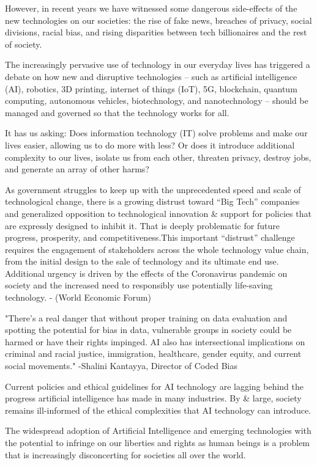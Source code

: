 \documentclass[11pt]{book} %
\begin{document}
		However, in recent years we have witnessed some dangerous side-effects of the new technologies on our societies: the rise of fake news, breaches of privacy, social divisions, racial bias, and rising disparities between tech billionaires and the rest of society.
		
		The increasingly pervasive use of technology in our everyday lives has triggered a debate on how new and disruptive technologies – such as artificial intelligence (AI), robotics, 3D printing, internet of things (IoT), 5G, blockchain, quantum computing, autonomous vehicles, biotechnology, and nanotechnology – should be managed and governed so that the technology works for all.
		
		It has us asking: Does information technology (IT) solve problems and make our lives easier, allowing us to do more with less? Or does it introduce additional complexity to our lives, isolate us from each other, threaten privacy, destroy jobs, and generate an array of other harms?
		
		As government struggles to keep up with the unprecedented speed and scale of technological change, there is a growing distrust toward “Big Tech” companies and generalized opposition to technological innovation \& support for policies that are expressly designed to inhibit it. That is deeply problematic for future progress, prosperity, and competitiveness.This important “distrust” challenge requires the engagement of stakeholders across the whole technology value chain, from the initial design to the sale of technology and its ultimate end use. Additional urgency is driven by the effects of the Coronavirus pandemic on society and the increased need to responsibly use potentially life-saving technology.
		- (World Economic Forum)
		
		"There’s a real danger that without proper training on data evaluation and spotting the potential for bias in data, vulnerable groups in society could be harmed or have their rights impinged. AI also has intersectional implications on criminal and racial justice, immigration, healthcare, gender equity, and current social movements."
		-Shalini Kantayya, Director of Coded Bias
		
		Current policies and ethical guidelines for AI technology are lagging behind the progress artificial intelligence has made in many industries. By \& large, society remains ill-informed of the ethical complexities that AI technology can introduce. 
		
		The widespread adoption of Artificial Intelligence and emerging technologies with the potential to infringe on our liberties and rights as human beings is a problem that is increasingly disconcerting for societies all over the world.
		
\end{document}
